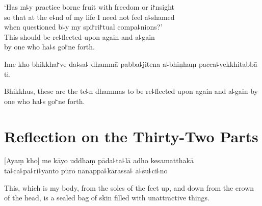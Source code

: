 \begin{english}
  `Has m꜕y practice borne fruit with freedom or i꜓nsight\\
  so that at the e꜕nd of my life I need not feel a꜕shamed\\
  when questioned b꜕y my spi꜓ri꜓tual compa꜕nions?'\\
  This should be re꜕flected upon again and a꜕gain\\
  by one who ha꜕s go꜓ne forth.
\end{english}

Ime kho bhikkha꜓ve da꜕sa꜕ dhammā pabba꜕jitena a꜕bhiṇhaṃ pacca꜕vekkhitabbā ti.

\begin{english}
  Bhikkhus, these are the te꜕n dhammas to be re꜕flected upon again and a꜕gain by one who ha꜕s go꜓ne forth.
\end{english}

\chapter[Thirty-Two Parts]{Reflection on the Thirty-Two Parts}%

\begin{leader}
\end{leader}

[Ayaṃ kho] me kāyo uddhaṃ pāda꜕ta꜕lā adho kesamatthakā\\
ta꜕ca꜕pa꜕ri꜕yanto pūro nānappa꜕kārassa꜕ a꜕su꜕ci꜕no

\begin{english}
  This, which is my body, from the soles of the feet up, and down from the crown of the head, is a sealed bag of skin filled with unattractive things.
\end{english}

